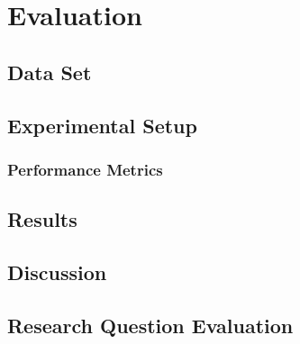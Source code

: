 \chapter{Evaluation}
\label{ch:evaluation}

\section{Data Set}
\label{sec:dataset}

\section{Experimental Setup}

\subsection{Performance Metrics}

\section{Results}
\label{sec:results}

\section{Discussion}

\section{Research Question Evaluation}
